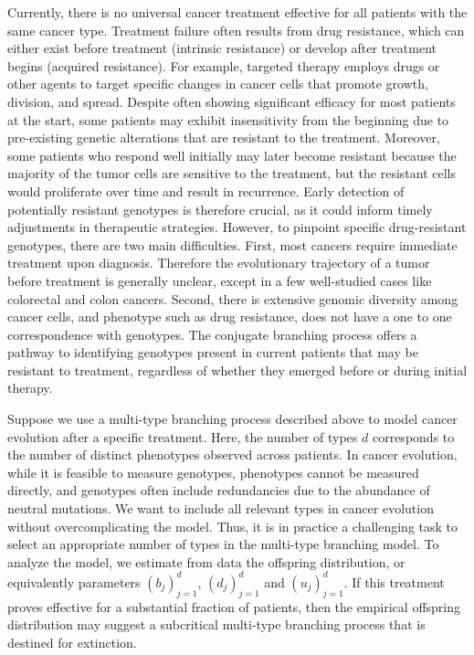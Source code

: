 \documentclass[11pt]{article}
\theoremstyle{plain}
\theoremstyle{definition}
\numberwithin{equation}{section}
\begin{document}
Currently, there is no universal cancer treatment effective for all patients with the same cancer type. Treatment failure often results from drug resistance, which can either exist before treatment (intrinsic resistance) or develop after treatment begins (acquired resistance). 
For example, targeted therapy employs drugs or other agents to target specific changes in cancer cells that promote growth, division, and spread. Despite often showing significant efficacy for most patients at the start, some patients may exhibit insensitivity from the beginning due to pre-existing genetic alterations that are resistant to the treatment. 
Moreover, some patients who respond well initially may later become resistant because the majority of the tumor cells are sensitive to the treatment, but the resistant cells would proliferate over time and result in recurrence. 
Early detection of potentially resistant genotypes is therefore crucial, as it could inform timely adjustments in therapeutic strategies. 
However, to pinpoint specific drug-resistant genotypes, there are two main difficulties.  
First, most cancers require immediate treatment upon diagnosis. Therefore the evolutionary trajectory of a tumor before treatment is generally unclear, except in a few well-studied cases like colorectal and colon cancers. 
Second, there is extensive genomic diversity among cancer cells, and phenotype such as drug resistance, does not have a one to one correspondence with genotypes. 
The conjugate branching process offers a pathway to identifying genotypes present in current patients that may be resistant to treatment, regardless of whether they emerged before or during initial therapy.

Suppose we use a multi-type branching process described above to model cancer evolution after a specific treatment. Here, the number of types $d$ corresponds to the number of distinct phenotypes observed across patients. In cancer evolution, while it is feasible to measure genotypes, phenotypes cannot be measured directly, and genotypes often include redundancies due to the abundance of neutral mutations. We want to include all relevant types in cancer evolution without overcomplicating the model. Thus, it is in practice a challenging task to select an appropriate number of types in the multi-type branching model. To analyze the model, we estimate from data the offspring distribution, or equivalently parameters $(b_j)_{j=1}^d$, $(d_j)_{j=1}^d$ and $(u_j)_{j=1}^d$. If this treatment proves effective for a substantial fraction of patients, then the empirical offspring distribution may suggest a subcritical multi-type branching process that is destined for extinction. 
\end{document}
